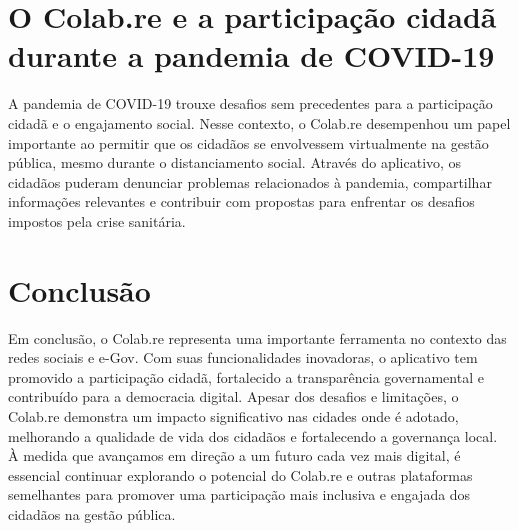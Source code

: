 \section*{O Colab.re e a participação cidadã durante a pandemia de COVID-19}
A pandemia de COVID-19 trouxe desafios sem precedentes para a participação cidadã e o engajamento social. Nesse contexto, o Colab.re desempenhou um papel importante ao permitir que os cidadãos se envolvessem virtualmente na gestão pública, mesmo durante o distanciamento social. Através do aplicativo, os cidadãos puderam denunciar problemas relacionados à pandemia, compartilhar informações relevantes e contribuir com propostas para enfrentar os desafios impostos pela crise sanitária.

\section*{Conclusão}
Em conclusão, o Colab.re representa uma importante ferramenta no contexto das redes sociais e e-Gov. Com suas funcionalidades inovadoras, o aplicativo tem promovido a participação cidadã, fortalecido a transparência governamental e contribuído para a democracia digital. Apesar dos desafios e limitações, o Colab.re demonstra um impacto significativo nas cidades onde é adotado, melhorando a qualidade de vida dos cidadãos e fortalecendo a governança local. À medida que avançamos em direção a um futuro cada vez mais digital, é essencial continuar explorando o potencial do Colab.re e outras plataformas semelhantes para promover uma participação mais inclusiva e engajada dos cidadãos na gestão pública.